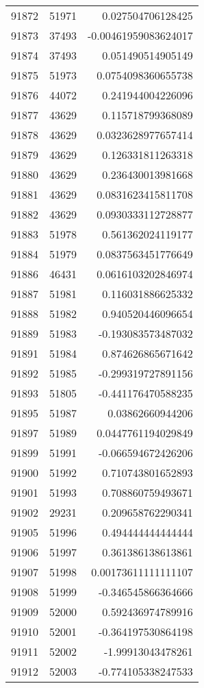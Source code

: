 \begin{tabular}{r | r | r}
91872 & 51971 & 0.027504706128425 \\
91873 & 37493 & -0.00461959083624017 \\
91874 & 37493 & 0.051490514905149 \\
91875 & 51973 & 0.0754098360655738 \\
91876 & 44072 & 0.241944004226096 \\
91877 & 43629 & 0.115718799368089 \\
91878 & 43629 & 0.0323628977657414 \\
91879 & 43629 & 0.126331811263318 \\
91880 & 43629 & 0.236430013981668 \\
91881 & 43629 & 0.0831623415811708 \\
91882 & 43629 & 0.0930333112728877 \\
91883 & 51978 & 0.561362024119177 \\
91884 & 51979 & 0.0837563451776649 \\
91886 & 46431 & 0.0616103202846974 \\
91887 & 51981 & 0.116031886625332 \\
91888 & 51982 & 0.940520446096654 \\
91889 & 51983 & -0.193083573487032 \\
91891 & 51984 & 0.874626865671642 \\
91892 & 51985 & -0.299319727891156 \\
91893 & 51805 & -0.441176470588235 \\
91895 & 51987 & 0.03862660944206 \\
91897 & 51989 & 0.0447761194029849 \\
91899 & 51991 & -0.066594672426206 \\
91900 & 51992 & 0.710743801652893 \\
91901 & 51993 & 0.708860759493671 \\
91902 & 29231 & 0.209658762290341 \\
91905 & 51996 & 0.494444444444444 \\
91906 & 51997 & 0.361386138613861 \\
91907 & 51998 & 0.00173611111111107 \\
91908 & 51999 & -0.346545866364666 \\
91909 & 52000 & 0.592436974789916 \\
91910 & 52001 & -0.364197530864198 \\
91911 & 52002 & -1.99913043478261 \\
91912 & 52003 & -0.774105338247533 \\

\end{tabular}
